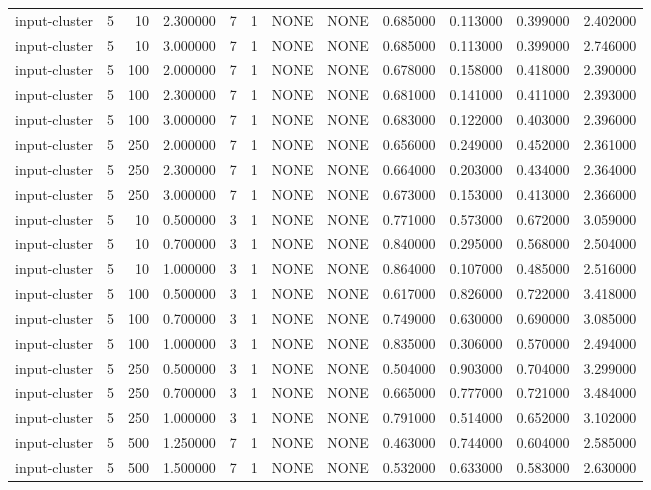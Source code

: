 \begin{tabular}{lrrrllllrrrr}
input-cluster & 5 & 10 & 2.300000 & 7 & 1 & NONE & NONE & 0.685000 & 0.113000 & 0.399000 & 2.402000 \\
input-cluster & 5 & 10 & 3.000000 & 7 & 1 & NONE & NONE & 0.685000 & 0.113000 & 0.399000 & 2.746000 \\
input-cluster & 5 & 100 & 2.000000 & 7 & 1 & NONE & NONE & 0.678000 & 0.158000 & 0.418000 & 2.390000 \\
input-cluster & 5 & 100 & 2.300000 & 7 & 1 & NONE & NONE & 0.681000 & 0.141000 & 0.411000 & 2.393000 \\
input-cluster & 5 & 100 & 3.000000 & 7 & 1 & NONE & NONE & 0.683000 & 0.122000 & 0.403000 & 2.396000 \\
input-cluster & 5 & 250 & 2.000000 & 7 & 1 & NONE & NONE & 0.656000 & 0.249000 & 0.452000 & 2.361000 \\
input-cluster & 5 & 250 & 2.300000 & 7 & 1 & NONE & NONE & 0.664000 & 0.203000 & 0.434000 & 2.364000 \\
input-cluster & 5 & 250 & 3.000000 & 7 & 1 & NONE & NONE & 0.673000 & 0.153000 & 0.413000 & 2.366000 \\
input-cluster & 5 & 10 & 0.500000 & 3 & 1 & NONE & NONE & 0.771000 & 0.573000 & 0.672000 & 3.059000 \\
input-cluster & 5 & 10 & 0.700000 & 3 & 1 & NONE & NONE & 0.840000 & 0.295000 & 0.568000 & 2.504000 \\
input-cluster & 5 & 10 & 1.000000 & 3 & 1 & NONE & NONE & 0.864000 & 0.107000 & 0.485000 & 2.516000 \\
input-cluster & 5 & 100 & 0.500000 & 3 & 1 & NONE & NONE & 0.617000 & 0.826000 & 0.722000 & 3.418000 \\
input-cluster & 5 & 100 & 0.700000 & 3 & 1 & NONE & NONE & 0.749000 & 0.630000 & 0.690000 & 3.085000 \\
input-cluster & 5 & 100 & 1.000000 & 3 & 1 & NONE & NONE & 0.835000 & 0.306000 & 0.570000 & 2.494000 \\
input-cluster & 5 & 250 & 0.500000 & 3 & 1 & NONE & NONE & 0.504000 & 0.903000 & 0.704000 & 3.299000 \\
input-cluster & 5 & 250 & 0.700000 & 3 & 1 & NONE & NONE & 0.665000 & 0.777000 & 0.721000 & 3.484000 \\
input-cluster & 5 & 250 & 1.000000 & 3 & 1 & NONE & NONE & 0.791000 & 0.514000 & 0.652000 & 3.102000 \\
input-cluster & 5 & 500 & 1.250000 & 7 & 1 & NONE & NONE & 0.463000 & 0.744000 & 0.604000 & 2.585000 \\
input-cluster & 5 & 500 & 1.500000 & 7 & 1 & NONE & NONE & 0.532000 & 0.633000 & 0.583000 & 2.630000 \\

\end{tabular}
